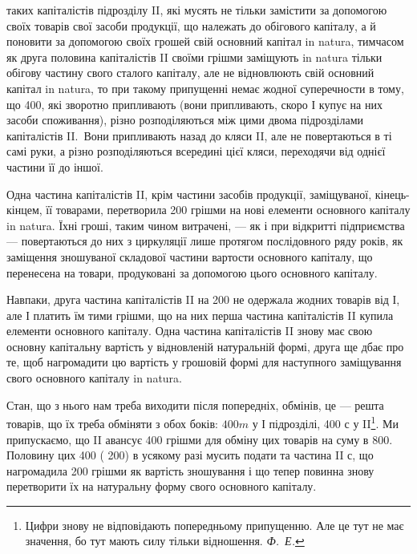 \parcont{}  %
таких капіталістів підрозділу II, які мусять не тільки замістити за допомогою
своїх товарів свої засоби продукції, що належать до обігового
капіталу, а й поновити за допомогою своїх грошей свій основний
капітал in natura, тимчасом як друга половина капіталістів II своїми
грішми заміщують  in natura тільки обігову частину свого сталого капіталу,
але не відновлюють свій основний капітал  in natura, то при такому
припущенні немає жодної суперечности в тому, що 400, які зворотно
припливають (вони припливають, скоро І купує на них засоби
споживання), різно розподіляються між цими двома підрозділами капіталістів
II.~Вони припливають назад до кляси II, але не повертаються в ті
самі руки, а різно розподіляються всередині цієї кляси, переходячи від
однієї частини її до іншої.

Одна частина капіталістів II, крім частини засобів продукції, заміщуваної,
кінець-кінцем, її товарами, перетворила 200 грішми на
нові елементи основного капіталу  in natura. Їхні гроші, таким чином
витрачені, — як і при відкритті підприємства — повертаються до них з циркуляції
лише протягом послідовного ряду років, як заміщення зношуваної
складової частини вартости основного капіталу, що перенесена на товари,
продуковані за допомогою цього основного капіталу.

Навпаки, друга частина капіталістів II на 200 не одержала
жодних товарів від І, але І платить їм тими грішми, що на них перша
частина капіталістів II купила елементи основного капіталу. Одна частина
капіталістів II знову має свою основну капітальну вартість у відновленій
натуральній формі, друга ще дбає про те, щоб нагромадити цю вартість
у грошовій формі для наступного заміщування свого основного капіталу
in natura.

Стан, що з нього нам треба виходити після попередніх, обмінів, це —
решта товарів, що їх треба обміняти з обох боків: $400 m$ у І підрозділі, 400 с
у II\footnote{
Цифри знову не відповідають попередньому припущенню. Але це тут не має
значення, бо тут мають силу тільки відношення. \emph{Ф.~Е.}
}. Ми припускаємо, що II авансує 400 грішми для обміну цих товарів
на суму в 800. Половину цих 400 (\deq{} 200) в усякому разі мусить подати
та частина II с, що нагромадила 200 грішми як вартість зношування
і що тепер повинна знову перетворити їх на натуральну форму свого
основного капіталу.


